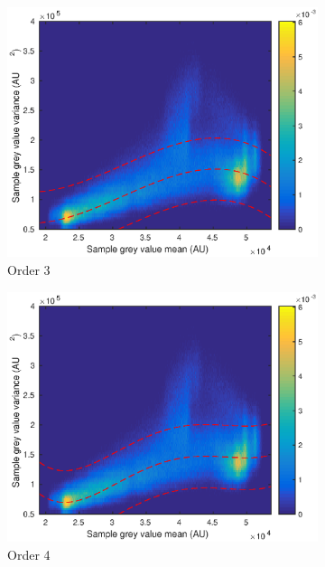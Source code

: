 \documentclass[12pt]{report}
\begin{document}
\begin{figure}
\begin{subfigure}{0.45\textwidth}
		\includegraphics[width=\textwidth]{figures/meanVar/order3.eps}
		\caption{Order 3}
	\end{subfigure}
	\begin{subfigure}{0.45\textwidth}
		\includegraphics[width=\textwidth]{figures/meanVar/order4.eps}
		\caption{Order 4}
	\end{subfigure}
	\begin{subfigure}{0.45\textwidth}

\end{subfigure}
\end{figure}
\end{document}
